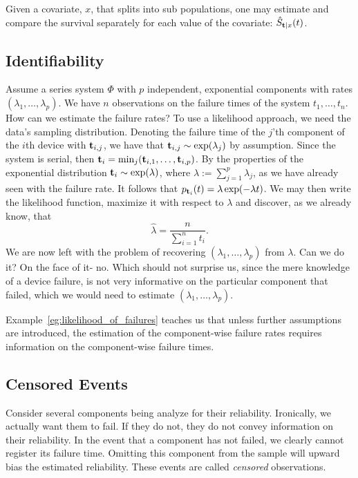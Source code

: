 Given a covariate, $x$, that splits into sub populations, one may estimate and compare the survival separately for each value of the covariate: $\hat{S}_{\mathbf{t}|x} (t)$.






\subsection{Identifiability}

\begin{example}
\label{eg:likelihood_of_failures}
Assume a series system $\Phi$ with $p$ independent, exponential components with rates $(\lambda_1,\dots,\lambda_p)$.
We have $n$ observations on the failure times of the system $t_1,\dots,t_n$.
How can we estimate the failure rates?
To use a likelihood approach, we need the data's sampling distribution.
Denoting the failure time of the $j$'th component of the $i$th device with $\mathbf{t}_{i,j}$, we have that $\mathbf{t}_{i,j}\sim \exp(\lambda_j)$ by assumption.
Since the system is serial, then $\mathbf{t}_i=\min_j(\mathbf{t}_{i,1},\dots,\mathbf{t}_{i,p})$.
By the properties of the exponential distribution $\mathbf{t}_i \sim \exp(\lambda)$, where $\lambda:=\sum_{j=1}^{p} \lambda_j$, as we have already seen with the failure rate. It follows that
$p_{\mathbf{t}_i} (t)=\lambda \exp(-\lambda t)$.
We may then write the likelihood function, maximize it with respect to $\lambda$ and discover, as we already know, that $$\hat{\lambda}=\frac{n}{\sum_{i=1}^{n} t_i}.$$
We are now left with the problem of recovering $(\lambda_1,\dots,\lambda_p)$ from $\lambda$. 
Can we do it? On the face of it- no. Which should not surprise us, since the mere knowledge of a device failure, is not very informative on the particular component that failed, which we would need to estimate $(\lambda_1,\dots,\lambda_p)$.
\end{example}

Example~\ref{eg:likelihood_of_failures} teaches us that unless further assumptions are introduced, the estimation of the component-wise failure rates requires information on the component-wise failure times. 





\subsection{Censored Events}
Consider several components being analyze for their reliability. 
Ironically, we actually want them to fail. If they do not, they do not convey information on their reliability.
In the event that a component has not failed, we clearly cannot register its failure time. 
Omitting this component from the sample will upward bias the estimated reliability.
These events are called \emph{censored} observations. 


